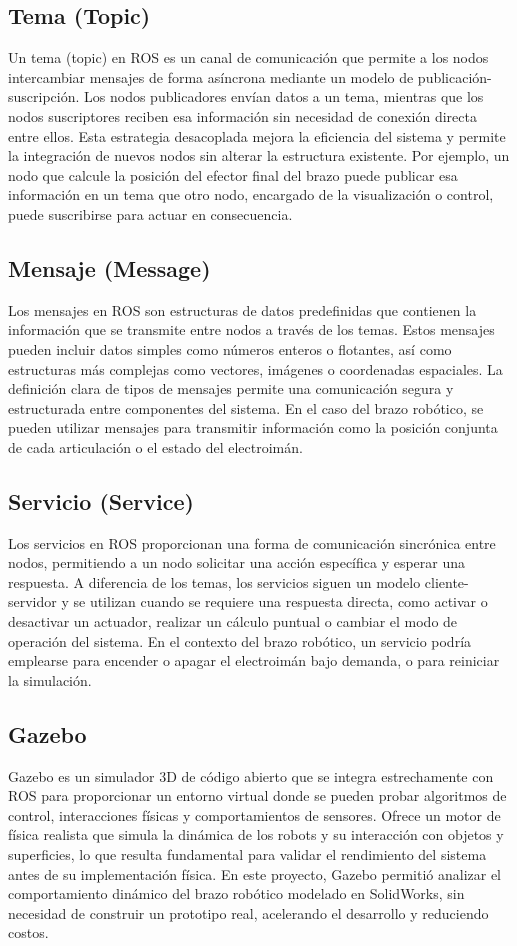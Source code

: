 \subsection{Tema (Topic)}
Un tema (topic) en ROS es un canal de comunicación que permite a los nodos intercambiar mensajes de forma asíncrona mediante un modelo de publicación-suscripción. Los nodos publicadores envían datos a un tema, mientras que los nodos suscriptores reciben esa información sin necesidad de conexión directa entre ellos. Esta estrategia desacoplada mejora la eficiencia del sistema y permite la integración de nuevos nodos sin alterar la estructura existente. Por ejemplo, un nodo que calcule la posición del efector final del brazo puede publicar esa información en un tema que otro nodo, encargado de la visualización o control, puede suscribirse para actuar en consecuencia.


\subsection{Mensaje (Message)}
Los mensajes en ROS son estructuras de datos predefinidas que contienen la información que se transmite entre nodos a través de los temas. Estos mensajes pueden incluir datos simples como números enteros o flotantes, así como estructuras más complejas como vectores, imágenes o coordenadas espaciales. La definición clara de tipos de mensajes permite una comunicación segura y estructurada entre componentes del sistema. En el caso del brazo robótico, se pueden utilizar mensajes para transmitir información como la posición conjunta de cada articulación o el estado del electroimán.


\subsection{Servicio (Service)}
Los servicios en ROS proporcionan una forma de comunicación sincrónica entre nodos, permitiendo a un nodo solicitar una acción específica y esperar una respuesta. A diferencia de los temas, los servicios siguen un modelo cliente-servidor y se utilizan cuando se requiere una respuesta directa, como activar o desactivar un actuador, realizar un cálculo puntual o cambiar el modo de operación del sistema. En el contexto del brazo robótico, un servicio podría emplearse para encender o apagar el electroimán bajo demanda, o para reiniciar la simulación.


\subsection{Gazebo}
Gazebo es un simulador 3D de código abierto que se integra estrechamente con ROS para proporcionar un entorno virtual donde se pueden probar algoritmos de control, interacciones físicas y comportamientos de sensores. Ofrece un motor de física realista que simula la dinámica de los robots y su interacción con objetos y superficies, lo que resulta fundamental para validar el rendimiento del sistema antes de su implementación física. En este proyecto, Gazebo permitió analizar el comportamiento dinámico del brazo robótico modelado en SolidWorks, sin necesidad de construir un prototipo real, acelerando el desarrollo y reduciendo costos.


